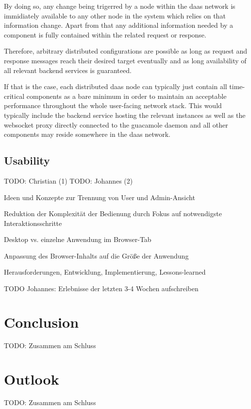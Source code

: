 \documentclass[runningheads]{llncs}
\begin{document}
By doing so, any change being trigerred by a node within the daas network
is immidiately available to any other node in the system
which relies on that information change.
Apart from that any additional information needed by a component
is fully contained within the related request or response.

Therefore, arbitrary distributed configurations are possible
as long as request and response messages reach their desired target eventually
and as long availability of all relevant backend services is guaranteed.

If that is the case, each distributed daas node can typically
just contain all time-critical components as a bare minimum
in order to maintain an acceptable performance throughout the whole user-facing network stack.
This would typically include the backend service hosting the relevant instances
as well as the websocket proxy directly connected to the guacamole daemon
and all other components may reside somewhere in the daas network.


\subsection{Usability}

TODO: Christian (1)
TODO: Johannes (2)

Ideen und Konzepte zur Trennung von User und Admin-Ansicht

Reduktion der Komplexität der Bedienung durch Fokus auf notwendigste Interaktionsschritte

Desktop vs. einzelne Anwendung im Browser-Tab

Anpassung des Browser-Inhalts auf die Größe der Anwendung

Herausforderungen, Entwicklung, Implementierung, Lessons-learned

TODO Johannes: Erlebnisse der letzten 3-4 Wochen aufschreiben



\section{Conclusion}

TODO: Zusammen am Schluss

\section{Outlook}

TODO: Zusammen am Schluss
\end{document}
